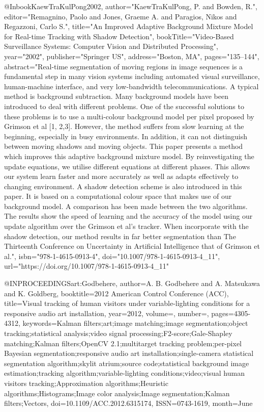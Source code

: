 @Inbook{KaewTraKulPong2002,
    author="KaewTraKulPong, P. and Bowden, R.",
    editor="Remagnino, Paolo
    and Jones, Graeme A.
    and Paragios, Nikos
    and Regazzoni, Carlo S.",
    title="An Improved Adaptive Background Mixture Model for Real-time Tracking with Shadow Detection",
    bookTitle="Video-Based Surveillance Systems: Computer Vision and Distributed Processing",
    year="2002",
    publisher="Springer US",
    address="Boston, MA",
    pages="135--144",
    abstract="Real-time segmentation of moving regions in image sequences is a fundamental step in many vision systems including automated visual surveillance, human-machine interface, and very low-bandwidth telecommunications. A typical method is background subtraction. Many background models have been introduced to deal with different problems. One of the successful solutions to these problems is to use a multi-colour background model per pixel proposed by Grimson et al [1, 2,3]. However, the method suffers from slow learning at the beginning, especially in busy environments. In addition, it can not distinguish between moving shadows and moving objects. This paper presents a method which improves this adaptive background mixture model. By reinvestigating the update equations, we utilise different equations at different phases. This allows our system learn faster and more accurately as well as adapts effectively to changing environment. A shadow detection scheme is also introduced in this paper. It is based on a computational colour space that makes use of our background model. A comparison has been made between the two algorithms. The results show the speed of learning and the accuracy of the model using our update algorithm over the Grimson et al's tracker. When incorporate with the shadow detection, our method results in far better segmentation than The Thirteenth Conference on Uncertainty in Artificial Intelligence that of Grimson et al.",
    isbn="978-1-4615-0913-4",
    doi="10.1007/978-1-4615-0913-4_11",
    url="https://doi.org/10.1007/978-1-4615-0913-4_11"
}

@INPROCEEDINGS{art:Godbehere,
    author={A. B. Godbehere and A. Matsukawa and K. Goldberg},
    booktitle={2012 American Control Conference (ACC)},
    title={Visual tracking of human visitors under variable-lighting conditions for a responsive audio art installation},
    year={2012},
    volume={},
    number={},
    pages={4305-4312},
    keywords={Kalman filters;art;image matching;image segmentation;object tracking;statistical analysis;video signal processing;F2-score;Gale-Shapley matching;Kalman filters;OpenCV 2.1;multitarget tracking problem;per-pixel Bayesian segmentation;responsive audio art installation;single-camera statistical segmentation algorithm;skylit atrium;source code;statistical background image estimation;tracking algorithm;variable-lighting conditions;video;visual human visitors tracking;Approximation algorithms;Heuristic algorithms;Histograms;Image color analysis;Image segmentation;Kalman filters;Vectors},
    doi={10.1109/ACC.2012.6315174},
    ISSN={0743-1619},
    month={June}
}

